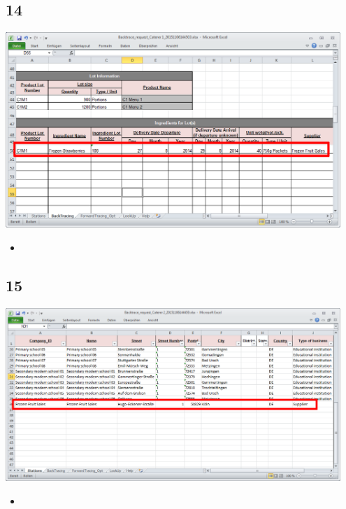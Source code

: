 \documentclass{beamer}
\begin{document}
\subsection{14}
\begin{frame}
	\begin{center}
  		\includegraphics[width=0.95\textwidth]{14.png}
	\end{center}
	\begin{itemize}
		\item
	\end{itemize}
\end{frame}

\subsection{15}
\begin{frame}
	\begin{center}
  		\includegraphics[width=0.95\textwidth]{15.png}
	\end{center}
	\begin{itemize}
		\item
	\end{itemize}
\end{frame}
\end{document}
